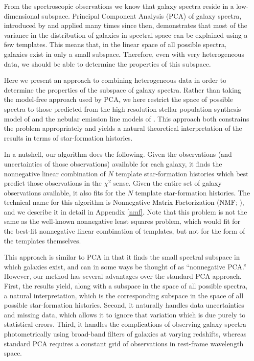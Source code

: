 \documentclass[10pt,preprint]{aastex}
\begin{document}
From the spectroscopic observations we know that galaxy spectra reside
in a low-dimensional subspace. Principal Component Analysis (PCA) of
galaxy spectra, introduced by \citet{connolly95b} and applied many
times since then, demonstrates that most of the variance in the
distribution of galaxies in spectral space can be explained using a
few templates. This means that, in the linear space of all possible
spectra, galaxies exist in only a small subspace. Therefore, even with
very heterogeneous data, we should be able to determine the properties
of this subspace.

Here we present an approach to combining heterogeneous data in order
to determine the properties of the subspace of galaxy spectra. Rather
than taking the model-free approach used by PCA, we here restrict the
space of possible spectra to those predicted from the high resolution
stellar population synthesis model of \citet{bruzual03a} and the
nebular emission line models of \citet{kewley01a}.  This approach both
constrains the problem appropriately and yields a natural theoretical
interpretation of the results in terms of star-formation histories.

In a nutshell, our algorithm does the following. Given the
observations (and uncertainties of those observations) available for
each galaxy, it finds the nonnegative linear combination of $N$
template star-formation histories which best predict those
observations in the $\chi^2$ sense. Given the entire set of galaxy
observations available, it also fits for the $N$ template
star-formation histories. The technical name for this algorithm is
Nonnegative Matrix Factorization (NMF; \citealt{lee99a, lee00a}), and
we describe it in detail in Appendix \ref{nmf}. Note that this problem
is not the same as the well-known nonnegative least squares problem,
which would fit for the best-fit nonnegative linear combination of
templates, but not for the form of the templates themselves.

This approach is similar to PCA in that it finds the small spectral
subspace in which galaxies exist, and can in some ways be thought of
as ``nonnegative PCA.''  However, our method has several advantages
over the standard PCA approach. First, the results yield, along with a
subspace in the space of all possible spectra, a natural
interpretation, which is the corresponding subspace in the space of
all possible star-formation histories. Second, it naturally handles
data uncertainties and missing data, which allows it to ignore that
variation which is due purely to statistical errors.  Third, it
handles the complications of observing galaxy spectra photometrically
using broad-band filters of galaxies at varying redshifts, whereas
standard PCA requires a constant grid of observations in rest-frame
wavelength space.
\end{document}
